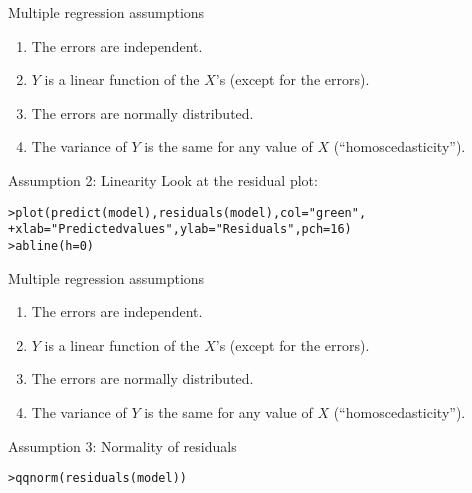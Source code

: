\documentclass{beamer}\usepackage[]{graphicx}\usepackage[]{color}
\makeatletter
\newcommand{\hlnum}[1]{\textcolor[rgb]{0.824,0.412,0.118}{#1}}%
\newcommand{\hlstr}[1]{\textcolor[rgb]{1,0.894,0.71}{#1}}%
\newcommand{\hlstd}[1]{\textcolor[rgb]{1,0.894,0.769}{#1}}%
\newcommand{\hlkwc}[1]{\textcolor[rgb]{0.78,0.941,0.545}{#1}}%
\newcommand{\hlkwd}[1]{\textcolor[rgb]{1,0.78,0.769}{#1}}%
\newenvironment{kframe}{%
 \def\at@end@of@kframe{}%
 \ifinner\ifhmode%
  \def\at@end@of@kframe{\end{minipage}}%
  \begin{minipage}{\columnwidth}%
 \fi\fi%
 \def\FrameCommand##1{\hskip\@totalleftmargin \hskip-\fboxsep
 \colorbox{shadecolor}{##1}\hskip-\fboxsep
     \hskip-\linewidth \hskip-\@totalleftmargin \hskip\columnwidth}%
 \MakeFramed {\advance\hsize-\width
   \@totalleftmargin\z@ \linewidth\hsize
   \@setminipage}}%
 {\par\unskip\endMakeFramed%
 \at@end@of@kframe}
\newenvironment{knitrout}{}{} %
\makeatother
\begin{document}
\begin{darkframes}
    \begin{frame}{Multiple regression assumptions}
      \begin{enumerate}
        \item The errors are independent. \greencheckmark
        \item $Y$ is a linear function of the $X$'s (except for the errors).
        \item The errors are normally distributed.
        \item The variance of $Y$ is the same for any value of $X$ (``homoscedasticity'').
      \end{enumerate}
    \end{frame}

    \begin{frame}[fragile]{Assumption 2: Linearity}
      Look at the residual plot:
      \fontsm
\begin{knitrout}
\begin{kframe}
\begin{alltt}
\hlstd{> }\hlkwd{plot}\hlstd{(}\hlkwd{predict}\hlstd{(model),} \hlkwd{residuals}\hlstd{(model),} \hlkwc{col}\hlstd{=}\hlstr{"green"}\hlstd{,}
\hlstd{+ }  \hlkwc{xlab}\hlstd{=}\hlstr{"Predicted values"}\hlstd{,} \hlkwc{ylab}\hlstd{=}\hlstr{"Residuals"}\hlstd{,} \hlkwc{pch}\hlstd{=}\hlnum{16}\hlstd{)}
\hlstd{> }\hlkwd{abline}\hlstd{(}\hlkwc{h}\hlstd{=}\hlnum{0}\hlstd{)}
\end{alltt}
\end{kframe}


\end{knitrout}
    \end{frame}

    \begin{frame}{Multiple regression assumptions}
      \begin{enumerate}
        \item The errors are independent. \greencheckmark
        \item $Y$ is a linear function of the $X$'s (except for the errors). \greencheckmark
        \item The errors are normally distributed.
        \item The variance of $Y$ is the same for any value of $X$ (``homoscedasticity'').
      \end{enumerate}
    \end{frame}

    \begin{frame}[fragile]{Assumption 3: Normality of residuals}
\begin{knitrout}
\begin{kframe}
\begin{alltt}
\hlstd{> }\hlkwd{qqnorm}\hlstd{(}\hlkwd{residuals}\hlstd{(model))}
\end{alltt}
\end{kframe}



\end{knitrout}
\end{frame}
\end{darkframes}
\end{document}
